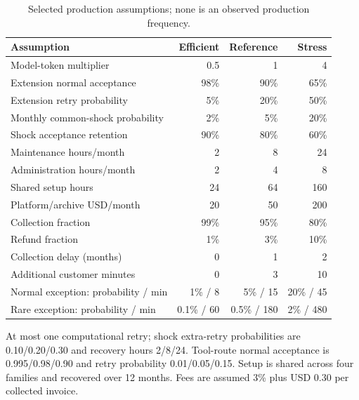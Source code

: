 \begin{table}[tbp]
\centering\small
\caption{Selected production assumptions; none is an observed production frequency.}
\label{tab:ec-assumptions}
\begin{tabular}{lrrr}
\toprule
Assumption & Efficient & Reference & Stress \\
\midrule
Model-token multiplier & 0.5 & 1 & 4 \\
Extension normal acceptance & 98\% & 90\% & 65\% \\
Extension retry probability & 5\% & 20\% & 50\% \\
Monthly common-shock probability & 2\% & 5\% & 20\% \\
Shock acceptance retention & 90\% & 80\% & 60\% \\
Maintenance hours/month & 2 & 8 & 24 \\
Administration hours/month & 2 & 4 & 8 \\
Shared setup hours & 24 & 64 & 160 \\
Platform/archive USD/month & 20 & 50 & 200 \\
Collection fraction & 99\% & 95\% & 80\% \\
Refund fraction & 1\% & 3\% & 10\% \\
Collection delay (months) & 0 & 1 & 2 \\
Additional customer minutes & 0 & 3 & 10 \\
Normal exception: probability / min & 1\% / 8 & 5\% / 15 & 20\% / 45 \\
Rare exception: probability / min & 0.1\% / 60 & 0.5\% / 180 & 2\% / 480 \\
\bottomrule
\end{tabular}
\par\smallskip\begin{minipage}{0.97\linewidth}\footnotesize At most one computational retry; shock extra-retry probabilities are 0.10/0.20/0.30 and recovery hours 2/8/24. Tool-route normal acceptance is 0.995/0.98/0.90 and retry probability 0.01/0.05/0.15. Setup is shared across four families and recovered over 12 months. Fees are assumed 3\% plus USD 0.30 per collected invoice.
\end{minipage}
\end{table}


